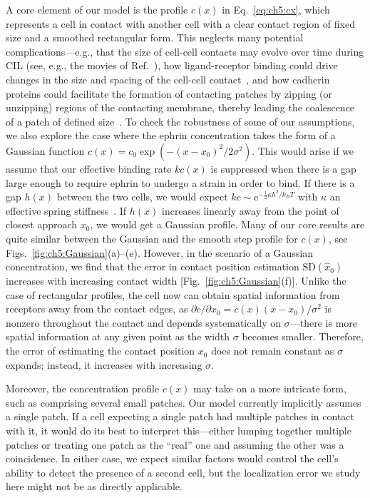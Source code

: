 A core element of our model is the profile $c(x)$ in Eq.~\eqref{eq:ch5:cx}, which represents a cell in contact with another cell with a clear contact region of fixed size and a smoothed rectangular form.
This neglects many potential complications---e.g., that the size of cell-cell contacts may evolve over time during CIL (see, e.g., the movies of Ref.~\cite{singh2021rules}), how ligand-receptor binding could drive changes in the size and spacing of the cell-cell contact~\cite{hu2013binding, dinapoli2021mesoscale}, and how cadherin proteins could facilitate the formation of contacting patches by zipping (or unzipping) regions of the contacting membrane, thereby leading the coalescence of a patch of defined size~\cite{adams1996quantitative}.
To check the robustness of some of our assumptions, we also explore the case where the ephrin concentration takes the form of a Gaussian function $c(x)=c_0\exp(-(x-x_0)^2/2\sigma^2)$.
This would arise if we assume that our effective binding rate $kc(x)$ is suppressed when there is a gap large enough to require ephrin to undergo a strain in order to bind.
If there is a gap $h(x)$ between the two cells, we would expect $kc \sim \mathrm{e}^{-\frac{1}{2}\kappa h^2 / k_B T}$ with $\kappa$ an effective spring stiffness~\cite{janes2022first}.
If $h(x)$ increases linearly away from the point of closest approach $x_0$, we would get a Gaussian profile.
Many of our core results are quite similar between the Gaussian and the smooth step profile for $c(x)$, see Figs.~\ref{fig:ch5:Gaussian}(a)--(e).
However, in the scenario of a Gaussian concentration, we find that the error in contact position estimation $\textrm{SD}(\hat{x}_0)$ increases with increasing contact width [Fig.~\ref{fig:ch5:Gaussian}(f)].
Unlike the case of rectangular profiles, the cell now can obtain spatial information from receptors away from the contact edges, as $\partial c/\partial x_0=c(x)(x-x_0)/\sigma^2$ is nonzero throughout the contact and depends systematically on $\sigma$---there is more spatial information at any given point as the width $\sigma$ becomes smaller.
Therefore, the error of estimating the contact position $x_0$ does not remain constant as $\sigma$ expands; instead, it increases with increasing $\sigma$.

Moreover, the concentration profile $c(x)$ may take on a more intricate form, such as comprising several small patches.
Our model currently implicitly assumes a single patch.
If a cell expecting a single patch had multiple patches in contact with it, it would do its best to interpret this---either lumping together multiple patches or treating one patch as the ``real'' one and assuming the other was a coincidence.
In either case, we expect similar factors would control the cell's ability to detect the presence of a second cell, but the localization error we study here might not be as directly applicable.


